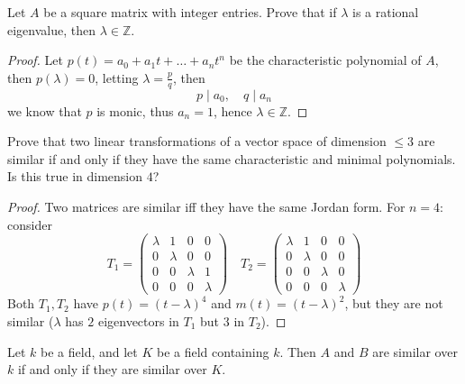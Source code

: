 \documentclass[openany]{book}
\newcommand{\Z}{\mathbb{Z}}
\begin{document}
\begin{prob}[6.13]
    Let $A$ be a square matrix with integer entries. Prove that if $\lambda$ is a rational eigenvalue, then $\lambda\in\mathbb{Z}$.
\end{prob}

\begin{proof}
    Let $p(t)=a_0+a_1t+\dots+a_nt^n$ be the characteristic polynomial of $A$, then $p(\lambda)=0$, letting $\lambda=\frac{p}{q}$, then 
    \begin{equation*}
        p\mid a_0,\quad q\mid a_n
    \end{equation*}
    we know that $p$ is monic, thus $a_n=1$, hence $\lambda\in\Z$.
\end{proof}

\begin{prob}[7.3]
    Prove that two linear transformations of a vector space of dimension \(\leq 3\) are similar if and only if they have the same characteristic and minimal polynomials. Is this true in dimension \(4\)?
\end{prob}
\begin{proof}
    Two matrices are similar iff they have the same Jordan form. For $n=4$: consider 
    \[
    T_1=\begin{pmatrix}
\lambda & 1 & 0 & 0 \\
0 & \lambda & 0 & 0 \\
0 & 0 & \lambda & 1 \\
0 & 0 & 0 & \lambda
\end{pmatrix} \quad 
T_2=\begin{pmatrix}
\lambda & 1 & 0 & 0 \\
0 & \lambda & 0 & 0 \\
0 & 0 & \lambda & 0 \\
0 & 0 & 0 & \lambda
\end{pmatrix}
\]
Both $T_1,T_2$ have $p(t)=(t-\lambda)^4$ and $m(t)=(t-\lambda)^2$, but they are not similar ($\lambda$ has $2$ eigenvectors in $T_1$ but $3$ in $T_2$).
\end{proof}

\begin{prop}[7.4]
    Let \(k\) be a field, and let \(K\) be a field containing \(k\). Then \(A\) and \(B\) are similar over \(k\) if and only if they are similar over \(K\).
\end{prop}
\end{document}
